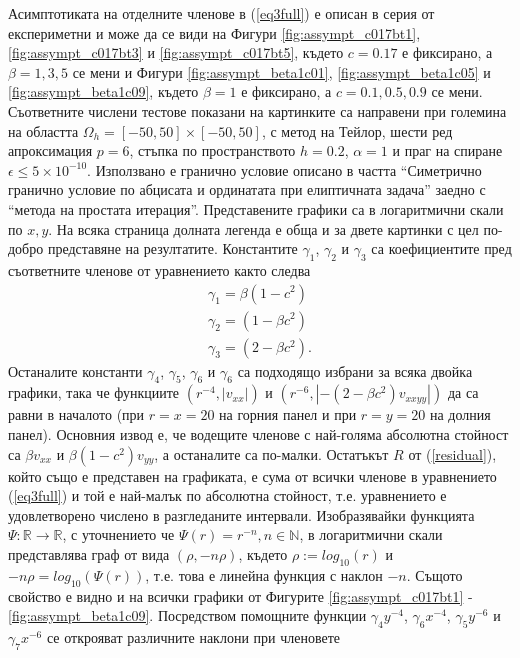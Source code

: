 \documentclass{article}
\newcommand{\rf}[1]{(\ref{#1})}
\newcommand{\RR}{\mathbb{R}}
\begin{document}
Асимптотиката на отделните членове в \rf{eq3full} е описан в серия от експериметни и може да се види на Фигури \ref{fig:assympt_c017bt1}, \ref{fig:assympt_c017bt3} и \ref{fig:assympt_c017bt5}, където $c=0.17$ е фиксирано, а $\beta = 1, 3, 5$ се мени и Фигури \ref{fig:assympt_beta1c01}, \ref{fig:assympt_beta1c05} и \ref{fig:assympt_beta1c09}, където $\beta=1$ е фиксирано, а $c = 0.1, 0.5, 0.9$ се мени. Съответните числени тестове показани на картинките са направени при големина на областта $\Omega_h = [-50, 50] \times [-50, 50]$, с метод на Тейлор, шести ред апроксимация $p=6$, стъпка по пространството $h=0.2$, $\alpha = 1$ и праг на спиране $\epsilon \le 5 \times 10^{-10}$. Използвано е гранично условие описано в частта ``Симетрично гранично условие по абцисата и ординатата при елиптичната задача'' заедно с ``метода на простата итерация''. Представените графики са в логаритмични скали по $x,y$. На всяка страница долната легенда е обща и за двете картинки с цел по-добро представяне на резултатите. Константите $\gamma_1$, $\gamma_2$ и $\gamma_3$ са коефициентите пред съответните членове от уравнението както следва
\begin{align*}
\gamma_1 = \beta (1-c^2) \\
\gamma_2 = (1-\beta c^2) \\
\gamma_3 = (2-\beta c^2).
\end{align*}
Останалите константи $\gamma_4$, $\gamma_5$, $\gamma_6$ и $\gamma_6$ са подходящо избрани за всяка двойка графики, така че функциите $(r^{-4}, |v_{xx}|)$ и $(r^{-6}, |- (2-\beta c^2)v_{xxyy}|)$ да са равни в началото (при $r=x=20$ на горния панел и при $r=y=20$ на долния панел).
Основния извод е, че водещите членове с най-голяма абсолютна стойност са $\beta v_{xx}$ и $\beta (1-c^2) v_{yy}$, а останалите са по-малки. Остатъкът $R$ от \rf{residual}, който също е представен на графиката, е сума от всички членове в уравнението \rf{eq3full} и той е най-малък по абсолютна стойност, т.е. уравнението е удовлетворено числено в разгледаните интервали. 
Изобразявайки функцията $\Psi : \RR \rightarrow \RR$, с уточнението че $\Psi(r) = r^{-n}, n \in \mathbb{N}$, в логаритмични скали представлява граф от вида $(\rho, -n \rho )$, където $\rho := log_{10}(r)$ и $ -n \rho = log_{10}( \Psi(r) ) $, т.е. това е линейна функция с наклон $-n$. Същото свойство е видно и на всички графики от Фигурите \ref{fig:assympt_c017bt1} - \ref{fig:assympt_beta1c09}. Посредством помощните функции $\gamma_4 y^{-4}$, $\gamma_6 x^{-4}$, $\gamma_5 y^{-6}$ и $\gamma_7 x^{-6}$ се открояват различните наклони при членовете 
\end{document}
